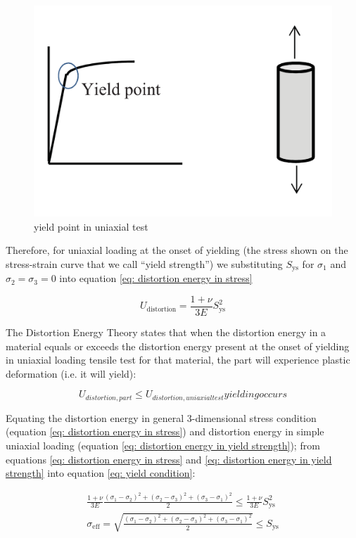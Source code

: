\begin{figure}[h!]
\centering
\includegraphics[width=0.5\linewidth]{figure/uniaxial_test_yield}
\caption{yield point in uniaxial test}
\label{fig:uniaxialtestyield}
\end{figure}

Therefore, for uniaxial loading at the onset of yielding (the stress shown on the stress-strain curve that we call “yield strength”) we substituting $ S_\mathrm{ys} $ for $ \sigma_1 $ and $ \sigma_2 = \sigma_3 = 0 $ into equation \ref{eq: distortion energy in stress}

\begin{equation}\label{eq: distortion energy in yield strength}
U_\mathrm{distortion} = \frac{1+\nu}{3E} S_\mathrm{ys}^2
\end{equation}

The Distortion Energy Theory states that when the distortion energy in a material equals or exceeds the distortion energy present at the onset of yielding in uniaxial loading tensile test for that material, the part will experience plastic deformation (i.e. it will yield):

\begin{equation}\label{eq: yield condition}
U_{distortion, part} \leq U_{distortion, uniaxial test} yielding occurs
\end{equation}

Equating the distortion energy in general 3-dimensional stress condition (equation \ref{eq: distortion energy in stress}) and distortion energy in simple uniaxial loading (equation \ref{eq: distortion energy in yield strength}); from equations \ref{eq: distortion energy in stress} and \ref{eq: distortion energy in yield strength} into equation \ref{eq: yield condition}:

\begin{equation}\label{key}
\begin{split}
\frac{1+\nu}{3E}\frac{(\sigma_1-\sigma_2)^2+(\sigma_2-\sigma_3)^2+(\sigma_3-\sigma_1)^2}{2} \leq \frac{1+\nu}{3E} S_\mathrm{ys}^2 \\
\sigma_\mathrm{eff} = \sqrt{\frac{(\sigma_1-\sigma_2)^2+(\sigma_2-\sigma_3)^2+(\sigma_3-\sigma_1)^2}{2}} \leq S_\mathrm{ys}
\end{split}
\end{equation}